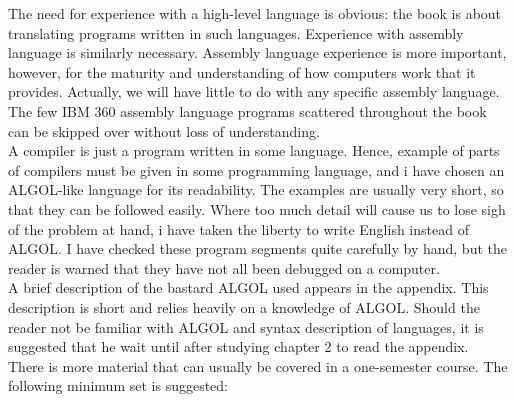 \documentclass[../main.tex]{subfiles}
\begin{document}
The need for experience with a high-level language is obvious: the book is about translating programs written in such languages. Experience with assembly language is similarly necessary. Assembly language experience is more important, however, for the maturity and understanding of how computers work that it provides. Actually, we will have little to do with any specific assembly language. The few IBM 360 assembly language programs scattered throughout the book can be skipped over without loss of understanding.\\

A compiler is just a program written in some language. Hence, example of parts of compilers must be given in some programming language, and i have chosen an ALGOL-like language for its readability. The examples are usually very short, so that they can be followed easily. Where too much detail will cause us to lose sigh of the problem at hand, i have taken the liberty to write English instead of ALGOL. I have checked these program segments quite carefully by hand, but the reader is warned that they have not all been debugged on a computer.\\

A brief description of the bastard ALGOL used appears in the appendix. This description is short and relies heavily on a knowledge of ALGOL. Should the reader not be familiar with ALGOL and syntax description of languages, it is suggested that he wait until after studying chapter 2 to read the appendix.\\

There is more material that can usually be covered in a one-semester course. The following minimum set is suggested:
\end{document}
